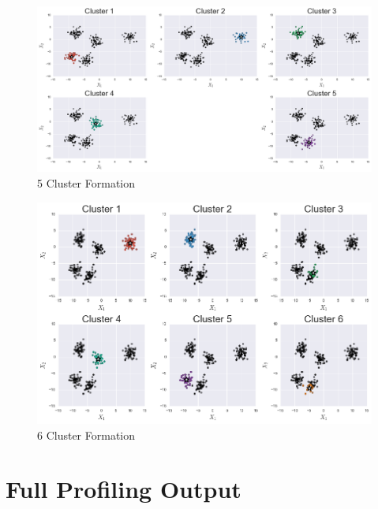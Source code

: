 \documentclass[10pt,twocolumn,letterpaper]{article}
\begin{document}
\begin{appendices}
\begin{figure}[htbp] 
\begin{center}
\includegraphics[scale=0.45]{figure/5_fomration.png}
\end{center}

\caption{\label{fig:5-Cluster-Formation}5 Cluster Formation}


\end{figure}


\begin{figure}[htbp] 
\begin{center}
\includegraphics[scale=0.55]{figure/6_formation.png}
\end{center}

\caption{\label{fig:6-Cluster-Formation}6 Cluster Formation}


\end{figure}

\onecolumn
\section{Full Profiling Output} \label{profiling-output}


\end{appendices}
\end{document}
